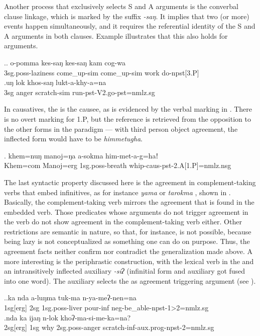 Another process that exclusively selects S and A arguments is the converbal clause linkage, which is marked by the suffix \emph{-saŋ}. It implies that two (or more) events happen  simultaneously, and it requires the referential identity of the S and A arguments in both clauses. Example \Next illustrates that this also holds for  arguments.

\ex.\ag. o-pomma kes-saŋ kes-saŋ kam cog-wa\\
{\sc 3sg.poss-}laziness come\_up{\sc -sim} come\_up{\sc -sim} work do{\sc -npst[3.P]}\\
\bg.uŋ lok khos-saŋ lukt-a-khy-a=na\\
{\sc 3sg} anger scratch{\sc -sim} run{\sc [3sg]-pst-V2.go-pst=nmlz.sg}\\
 

In causatives, the  is the causee, as is evidenced by the verbal marking in  \Next. There  is no overt marking for 1.P, but the reference is retrieved from the opposition to the other forms in the paradigm — with third person object agreement, the inflected form would have to be \emph{himmetugha}.

\exg. khem=nuŋ manoj=ŋa a-sokma him-met-a-g=haǃ\\
Khem{\sc =com} Manoj{\sc =erg} {\sc 1sg.poss-}breath whip{\sc -caus-pst-2.A[1.P]=nmlz.nsg}\\


The last syntactic property discussed here is the agreement in complement-taking verbs that embed infinitives, as for instance \emph{yama}  or \emph{tarokma} , shown in \Next. Basically, the complement-taking verb mirrors the agreement that is found in the embedded verb. Those predicates whose  arguments do not trigger agreement in the verb  do not show agreement in the complement-taking verb either. Other restrictions  are semantic in nature, so that, for instance,  is not possible, because being lazy is not conceptualized as something one can do on purpose. Thus, the agreement facts neither confirm nor contradict the generalization made above. A more interesting  is the periphrastic  construction, with the lexical verb in the  and an intransitively inflected auxiliary \emph{-siʔ} (infinitial form and auxiliary got fused into one word). The auxiliary selects the  as agreement triggering argument (see \Next[b]).


\ex.\ag.ka nda a-luŋma tuk-ma n-ya-meʔ-nen=na\\
{\sc 1sg[erg]} {\sc 2sg} {\sc 1sg.poss-}liver pour{\sc -inf} {\sc neg-}be\_able-{\sc npst-1>2=nmlz.sg}\\
\bg.nda ka ijaŋ n-lok khoʔ-ma-si-me-ka=na?\\
 {\sc 2sg[erg]} {\sc 1sg} why {\sc 2sg.poss-}anger scratch{\sc -inf-aux.prog-npst-2=nmlz.sg}\\


 	